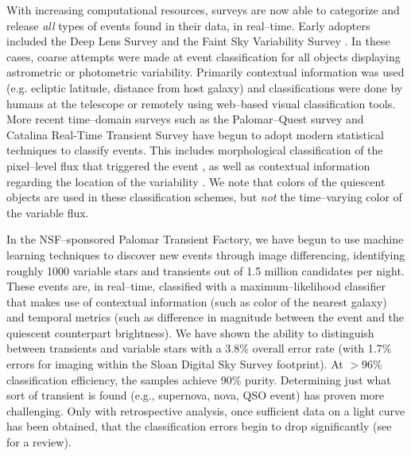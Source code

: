
With increasing computational resources, surveys are now able to categorize and
release {\it all} types of events found in their data, in real--time. Early
adopters included the Deep Lens Survey \citep{2004ApJ...611..418B} and the Faint
Sky Variability Survey \citep{2003MNRAS.339..427G}.  In these cases, coarse
attempts were made at event classification for all objects displaying
astrometric or photometric variability. Primarily contextual information was
used (e.g. ecliptic latitude, distance from host galaxy) and classifications
were done by humans at the telescope or remotely using web--based visual
classification tools.  More recent time--domain surveys such as the
Palomar--Quest survey \citep{2008AN....329..263D} and Catalina Real-Time
Transient Survey \citep{2011arXiv1102.5004D} have begun to adopt modern
statistical techniques to classify events.  This includes morphological
classification of the pixel--level flux that triggered the event
\citep{2008AIPC.1082..252D}, as well as contextual information regarding the
location of the variability \citep{2010ASPC..434..115M}.  We note that colors of
the quiescent objects are used in these classification schemes, but {\it not}
the time--varying color of the variable flux.


In the NSF--sponsored Palomar Transient Factory, we have begun to use machine
learning techniques to discover new events through image differencing,
identifying roughly 1000 variable stars and transients out of 1.5 million
candidates per night. These events are, in real--time, classified with a
maximum--likelihood classifier that makes use of contextual information (such as
color of the nearest galaxy) and temporal metrics (such as difference in
magnitude between the event and the quiescent counterpart brightness).  We have
shown \citep{2011arXiv1106.5491B} the ability to distinguish between transients
and variable stars with a 3.8\% overall error rate (with 1.7\% errors for
imaging within the Sloan Digital Sky Survey footprint).  At $>$96\%
classification efficiency, the samples achieve 90\% purity.  Determining just
what sort of transient is found (e.g., supernova, nova, QSO event) has proven
more challenging.  Only with retrospective analysis, once sufficient data on a
light curve has been obtained, that the classification errors begin to drop
significantly \citep{2011ApJ...733...10R} (see \citealt{2011arXiv1104.3142B} for
a review).

